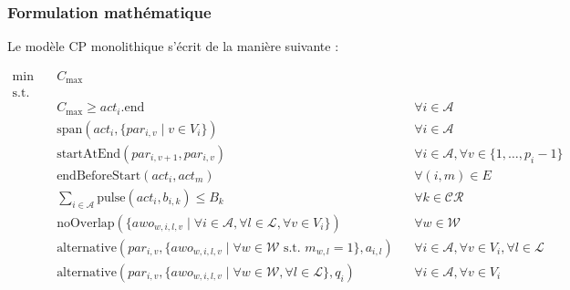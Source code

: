 \subsubsection{Formulation mathématique}
Le modèle CP monolithique s'écrit de la manière suivante :

\begin{align}
    \min \quad & C_{\max} \label{cp_obj} \\
    \text{s.t.} \quad & \nonumber \\
    & C_{\max} \geq act_i.\text{end} && \forall i \in \mathcal{A} \label{cp_makespan} \\
    & \text{span}(act_i, \{par_{i,v} \mid v \in V_i\}) && \forall i \in \mathcal{A} \label{cp_span} \\
    & \text{startAtEnd}(par_{i,v+1}, par_{i,v}) && \forall i \in \mathcal{A}, \forall v \in \{1, \dots, p_i-1\} \label{cp_contig} \\
    & \text{endBeforeStart}(act_i, act_m) && \forall (i,m) \in E \label{cp_prec} \\
    & \sum_{i \in \mathcal{A}} \text{pulse}(act_i, b_{i,k}) \leq B_k && \forall k \in \mathcal{CR} \label{cp_cumul_mat} \\
    & \text{noOverlap}(\{awo_{w,i,l,v} \mid \forall i \in \mathcal{A}, \forall l \in \mathcal{L}, \forall v \in V_i\}) && \forall w \in \mathcal{W} \label{cp_disj_w} \\
    & \text{alternative}(par_{i,v}, \{awo_{w,i,l,v} \mid \forall w \in \mathcal{W} \text{ s.t. } m_{w,l}=1\}, a_{i,l}) && \forall i \in \mathcal{A}, \forall v \in V_i, \forall l \in \mathcal{L} \label{cp_alt_l} \\
    & \text{alternative}(par_{i,v}, \{awo_{w,i,l,v} \mid \forall w \in \mathcal{W}, \forall l \in \mathcal{L}\}, q_i) && \forall i \in \mathcal{A}, \forall v \in V_i \label{cp_alt_q}
\end{align}

